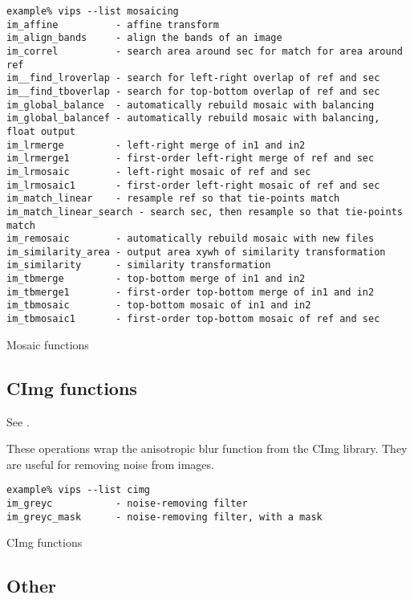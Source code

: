 \begin{fig2}
\begin{verbatim}
example% vips --list mosaicing
im_affine          - affine transform
im_align_bands     - align the bands of an image
im_correl          - search area around sec for match for area around ref
im__find_lroverlap - search for left-right overlap of ref and sec
im__find_tboverlap - search for top-bottom overlap of ref and sec
im_global_balance  - automatically rebuild mosaic with balancing
im_global_balancef - automatically rebuild mosaic with balancing, float output
im_lrmerge         - left-right merge of in1 and in2
im_lrmerge1        - first-order left-right merge of ref and sec
im_lrmosaic        - left-right mosaic of ref and sec
im_lrmosaic1       - first-order left-right mosaic of ref and sec
im_match_linear    - resample ref so that tie-points match
im_match_linear_search - search sec, then resample so that tie-points match
im_remosaic        - automatically rebuild mosaic with new files
im_similarity_area - output area xywh of similarity transformation
im_similarity      - similarity transformation
im_tbmerge         - top-bottom merge of in1 and in2
im_tbmerge1        - first-order top-bottom merge of in1 and in2
im_tbmosaic        - top-bottom mosaic of in1 and in2
im_tbmosaic1       - first-order top-bottom mosaic of ref and sec
\end{verbatim}
\caption{Mosaic functions}
\label{fg:mosaicing}
\end{fig2}

\subsection{CImg functions}

See .

These operations wrap the anisotropic blur function from the CImg library.
They are useful for removing noise from images.

\begin{fig2}
\begin{verbatim}
example% vips --list cimg
im_greyc           - noise-removing filter
im_greyc_mask      - noise-removing filter, with a mask
\end{verbatim}
\caption{CImg functions}
\label{fg:cimg}
\end{fig2}

\subsection{Other}

